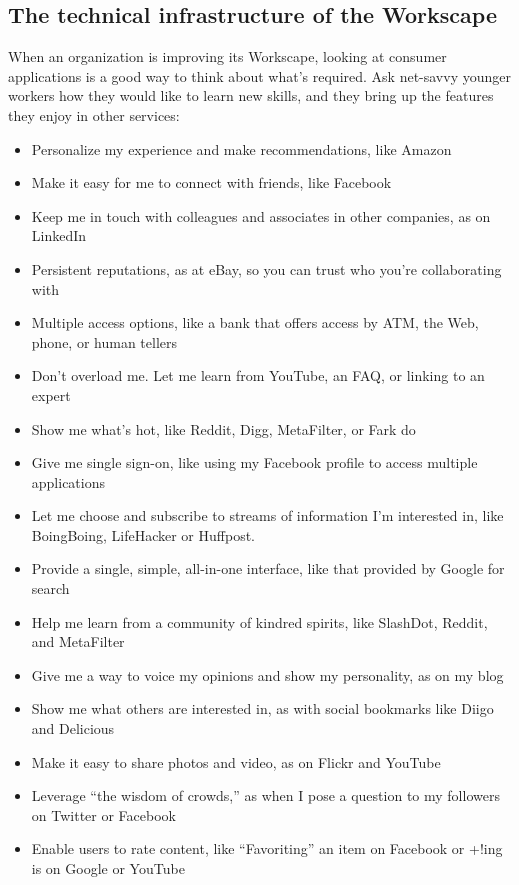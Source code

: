 \subsection{The technical infrastructure of the Workscape}

When an organization is improving its Workscape, looking at consumer
applications is a good way to think about what's required. Ask net-savvy
younger workers how they would like to learn new skills, and they bring
up the features they enjoy in other services:

\begin{itemize}
\item
  Personalize my experience and make recommendations, like Amazon
\item
  Make it easy for me to connect with friends, like Facebook
\item
  Keep me in touch with colleagues and associates in other companies, as
  on LinkedIn
\item
  Persistent reputations, as at eBay, so you can trust who you're
  collaborating with
\item
  Multiple access options, like a bank that offers access by ATM, the
  Web, phone, or human tellers
\item
  Don't overload me. Let me learn from YouTube, an FAQ, or linking to an
  expert
\item
  Show me what's hot, like Reddit, Digg, MetaFilter, or Fark do
\item
  Give me single sign-on, like using my Facebook profile to access
  multiple applications
\item
  Let me choose and subscribe to streams of information I'm interested
  in, like BoingBoing, LifeHacker or Huffpost.
\item
  Provide a single, simple, all-in-one interface, like that provided by
  Google for search
\item
  Help me learn from a community of kindred spirits, like SlashDot,
  Reddit, and MetaFilter
\item
  Give me a way to voice my opinions and show my personality, as on my
  blog
\item
  Show me what others are interested in, as with social bookmarks like
  Diigo and Delicious
\item
  Make it easy to share photos and video, as on Flickr and YouTube
\item
  Leverage ``the wisdom of crowds,'' as when I pose a question to my
  followers on Twitter or Facebook
\item
  Enable users to rate content, like ``Favoriting'' an item on Facebook
  or +!ing is on Google or YouTube
\end{itemize}


